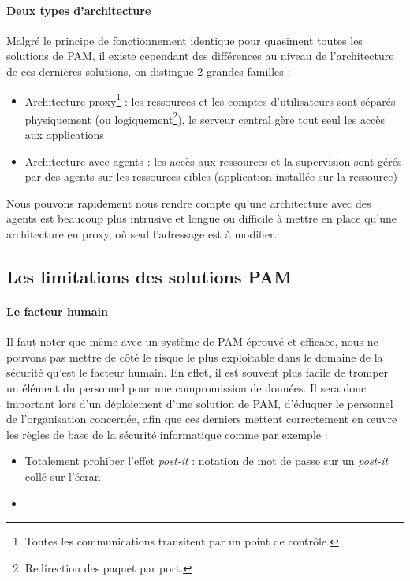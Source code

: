 \paragraph{Deux types d'architecture}
Malgré le principe de fonctionnement identique pour quasiment toutes les solutions de PAM, il existe cependant des différences au niveau de l'architecture de ces dernières solutions, on distingue 2 grandes familles :
\begin{itemize}
	\item Architecture proxy\footnote{Toutes les communications transitent par un point de contrôle.} : les ressources et les comptes d'utilisateurs sont séparés physiquement (ou logiquement\footnote{Redirection des paquet  par port.}), le serveur central gère tout seul les accès aux applications
	\item Architecture avec agents : les accès aux ressources et la supervision sont gérés par des agents sur les ressources cibles (application installée sur la ressource)
\end{itemize}
Nous pouvons rapidement nous rendre compte qu'une architecture avec des agents est beaucoup plus intrusive et longue ou difficile à mettre en place qu'une architecture en proxy, où seul l'adressage est à modifier.

\subsection{Les limitations des solutions PAM}

\paragraph{Le facteur humain} Il faut noter que même avec un système de PAM éprouvé et efficace, nous ne pouvons pas mettre de côté le risque le plus exploitable dans le domaine de la sécurité qu'est le facteur humain. En effet, il est souvent plus facile de tromper un élément du personnel pour une compromission de données. Il sera donc important lors d'un déploiement d'une solution de PAM, d'éduquer le personnel de l'organisation concernée, afin que ces derniers mettent correctement en œuvre les règles de base de la sécurité informatique comme par exemple :
\begin{itemize}
	\item Totalement prohiber \og l'effet \textit{post-it} \fg{} : notation de mot de passe sur un \textit{post-it} collé sur l'écran
	\item  
\end{itemize}

